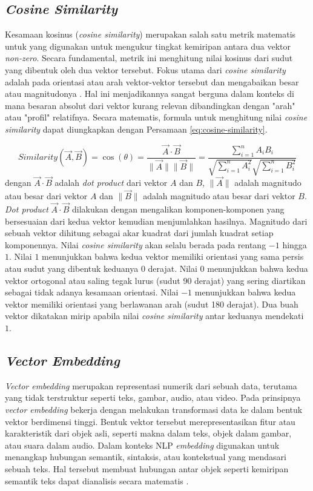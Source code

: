 \subsection{\textit{Cosine Similarity}}
Kesamaan kosinus (\textit{cosine similarity}) merupakan salah satu metrik matematis untuk yang digunakan untuk mengukur tingkat kemiripan antara dua vektor \textit{non-zero}.
Secara fundamental, metrik ini menghitung nilai kosinus dari sudut yang dibentuk oleh dua vektor tersebut.
Fokus utama dari \textit{cosine similarity} adalah pada orientasi atau arah vektor-vektor tersebut dan mengabaikan besar atau magnitudonya \cite{Xia2015CosineSimilarity}.
Hal ini menjadikannya sangat berguna dalam konteks di mana besaran absolut dari vektor kurang relevan dibandingkan dengan "arah" atau "profil" relatifnya.
Secara matematis, formula untuk menghitung nilai \textit{cosine similarity} dapat diungkapkan dengan Persamaan \ref{eq:cosine-similarity}.

\begin{equation}
	\text{$Similarity$}(\vec{A}, \vec{B}) = \cos{(\theta)} = \frac{\vec{A} \cdot \vec{B}}{\|\vec{A}\| \|\vec{B}\|} = \frac{\sum_{i=1}^{n} A_i B_i}{\sqrt{\sum_{i=1}^{n} A_i^2} \sqrt{\sum_{i=1}^{n} B_i^2}}
	\label{eq:cosine-similarity}
\end{equation}%
dengan $\vec{A} \cdot \vec{B}$ adalah \textit{dot product} dari vektor $A$ dan $B$, $\|\vec{A}\|$ adalah magnitudo atau besar dari vektor $A$ dan $\|\vec{B}\|$ adalah magnitudo atau besar dari vektor $B$.
\textit{Dot product} $\vec{A} \cdot \vec{B}$ dilakukan dengan mengalikan komponen-komponen yang bersesuaian dari kedua vektor kemudian menjumlahkan hasilnya.
Magnitudo dari sebuah vektor dihitung sebagai akar kuadrat dari jumlah kuadrat setiap komponennya.
Nilai \textit{cosine similarity} akan selalu berada pada rentang $-1$ hingga $1$.
Nilai $1$ menunjukkan bahwa kedua vektor memiliki orientasi yang sama persis atau sudut yang dibentuk keduanya 0 derajat.
Nilai $0$ menunjukkan bahwa kedua vektor ortogonal atau saling tegak lurus (sudut 90 derajat) yang sering diartikan sebagai tidak adanya kesamaan orientasi.
Nilai $-1$ menunjukkan bahwa kedua vektor memiliki orientasi yang berlawanan arah (sudut 180 derajat).
Dua buah vektor dikatakan mirip apabila nilai \textit{cosine similarity} antar keduanya mendekati $1$.


\subsection{\textit{Vector Embedding}}
\textit{Vector embedding} merupakan representasi numerik dari sebuah data, terutama yang tidak terstruktur seperti teks, gambar, audio, atau video.
Pada prinsipnya \textit{vector embedding} bekerja dengan melakukan transformasi data ke dalam bentuk vektor berdimensi tinggi.
Bentuk vektor tersebut merepresentasikan fitur atau karakteristik dari objek asli, seperti makna dalam teks, objek dalam gambar, atau suara dalam audio.
Dalam konteks NLP \textit{embedding} digunakan untuk menangkap hubungan semantik, sintaksis, atau kontekstual yang mendasari sebuah teks.
Hal tersebut membuat hubungan antar objek seperti kemiripan semantik teks dapat dianalisis secara matematis \cite{Singh2023EmbeddingVectorAndVectorDB}.

